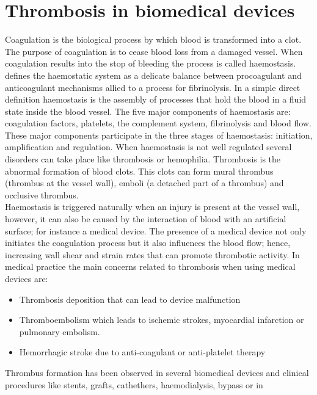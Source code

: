 \documentclass[%
 nofootinbib,
 amsmath,amssymb,
 aps,
 pra,
]{revtex4-1}
\begin{document}
\section{\label{sec:Blood}Thrombosis in biomedical devices}
Coagulation is the biological process by which blood is transformed into a clot. The purpose of coagulation is to cease blood loss from a damaged vessel. When coagulation results into the stop of bleeding the process is called haemostasis. \citet{Hoffbrand:2011} defines the haemostatic system as a delicate balance between procoagulant and anticoagulant mechanisms allied to a process for fibrinolysis. In a simple direct definition haemostasis is the assembly of processes that hold the blood in a fluid state inside the blood vessel. The five major components of haemostasis are: coagulation factors, platelets, the complement system, fibrinolysis and blood flow. These major components participate in the three stages of haemostasis: initiation, amplification and regulation. When haemostasis is not well regulated several disorders can take place like thrombosis or hemophilia. Thrombosis is the abnormal formation of blood clots. This clots can form mural thrombus (thrombus at the vessel wall), emboli (a detached part of a thrombus) and occlusive thrombus.\\ 
Haemostasis is triggered naturally when an injury is present at the vessel wall, however, it can also be caused by the interaction of blood with an artificial surface; for instance a medical device. The presence of a medical device not only initiates the coagulation process but it also influences the blood flow; hence, increasing wall shear and strain rates that can promote thrombotic activity. 
In medical practice the main concerns related to thrombosis when using medical devices are:
\begin{itemize}
\item Thrombosis deposition that can lead to device malfunction
\item Thromboembolism which leads to ischemic strokes, myocardial infarction or pulmonary embolism.
\item Hemorrhagic stroke due to anti-coagulant or anti-platelet therapy 
\end{itemize}
Thrombus formation has been observed in several biomedical devices and clinical procedures like stents, grafts, cathethers, haemodialysis, bypass or in %
\end{document}
